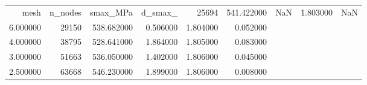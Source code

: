 \begin{tabular}{rrrrrr}
\toprule
mesh & n_nodes & smax_MPa & d_smax_%
 & 25694 & 541.422000 & NaN & 1.803000 & NaN \\
6.000000 & 29150 & 538.682000 & 0.506000 & 1.804000 & 0.052000 \\
4.000000 & 38795 & 528.641000 & 1.864000 & 1.805000 & 0.083000 \\
3.000000 & 51663 & 536.050000 & 1.402000 & 1.806000 & 0.045000 \\
2.500000 & 63668 & 546.230000 & 1.899000 & 1.806000 & 0.008000 \\
\bottomrule
\end{tabular}
